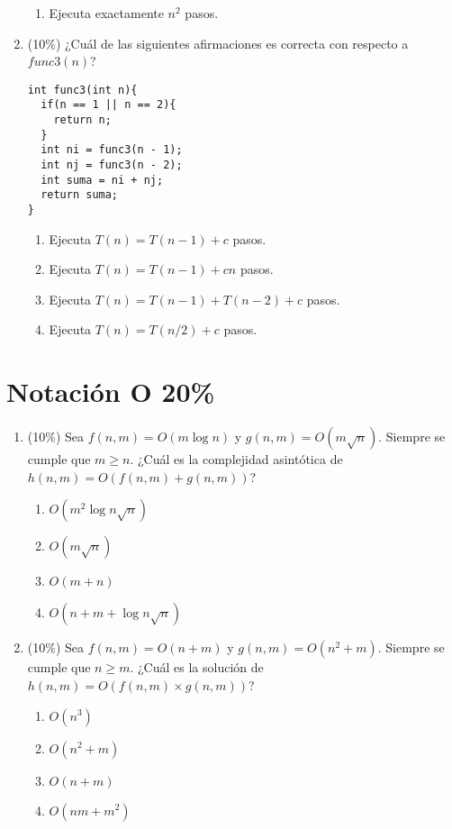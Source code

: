 \documentclass[10 pt]{article}
\begin{document}
\begin{multicols}{2}
\begin{enumerate}[label=(\alph*)]
\begin{enumerate}[label=(\roman*)]
\item Ejecuta exactamente $n ^ 2$ pasos.
\end{enumerate}
\item (10\%) ¿Cuál de las siguientes afirmaciones es correcta con respecto a $func3(n)$?
\begin{lstlisting}
int func3(int n){
  if(n == 1 || n == 2){
    return n;  
  }
  int ni = func3(n - 1);
  int nj = func3(n - 2);
  int suma = ni + nj;
  return suma;
}
\end{lstlisting}
\begin{enumerate}[label=(\roman*)]
\item Ejecuta $T(n) = T(n-1) + c$ pasos.
\item Ejecuta $T(n) = T(n-1) + c n$ pasos.
\item Ejecuta $T(n) = T(n-1) + T(n-2) + c$ pasos.
\item Ejecuta $T(n) = T(n/2) + c$ pasos.
\end{enumerate}
\end{enumerate}
\section{Notación O 20\%}
\begin{enumerate}[label=\alph*]
\item (10\%) Sea $f(n, m) = O(m \log n)$ y $g(n, m) = O(m\sqrt{n})$. Siempre se cumple que $m \geq n$. ¿Cuál es la complejidad asintótica de $h(n, m) = O(f(n, m) + g(n, m))$?
\begin{enumerate}[label=(\roman*)]
\item $O(m^2\log n \sqrt n)$
\item $O(m\sqrt{n})$
\item $O(m + n)$
\item $O(n + m + \log n \sqrt{n})$
\end{enumerate}
\item (10\%) Sea $f(n, m) = O(n + m)$ y $g(n, m) = O(n^2 + m)$. Siempre se cumple que $n \geq m$. ¿Cuál es la solución de $h(n, m) = O(f(n, m) \times g(n, m))$?
\begin{enumerate}[label=(\roman*)]
\item $O(n ^ 3)$
\item $O(n ^ 2 + m)$
\item $O(n + m)$
\item $O(nm + m^2)$
\end{enumerate}
\end{enumerate}

\end{multicols}
\end{document}
